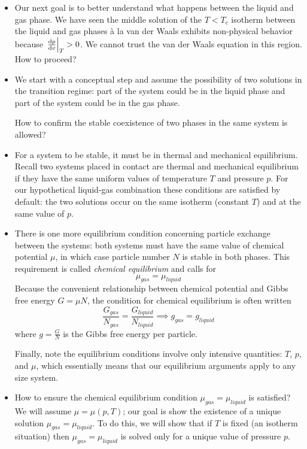 \documentclass[11pt, a4paper]{article}
\begin{document}
\begin{itemize}
	\item Our next goal is to better understand what happens between the liquid and gas phase. We have seen the middle solution of the $ T < T_{c} $ isotherm between the liquid and gas phases \`{a} la van der Waals exhibits non-physical behavior because $ \eval{\dv{p}{v}}_{T} > 0 $. We cannot trust the van der Waals equation in this region. How to proceed?
	
	\item We start with a conceptual step and assume the possibility of two solutions in the transition regime: part of the system could be in the liquid phase and part of the system could be in the gas phase. 
		
	How to confirm the stable coexistence of two phases in the same system is allowed? 
	
	\item For a system to be stable, it must be in thermal and mechanical equilibrium. Recall two systems placed in contact are thermal and mechanical equilibrium if they have the same uniform values of temperature $ T $ and pressure $ p $. For our hypothetical liquid-gas combination these conditions are satisfied by default: the two solutions occur on the same isotherm (constant $ T $) and at the same value of $ p $. 
	
	\item There is one more equilibrium condition concerning particle exchange between the systems: both systems must have the same value of chemical potential $ \mu $, in which case particle number $ N $ is stable in both phases. This requirement is called \textit{chemical equilibrium} and calls for
	\begin{equation*}
		\mu_{gas} = \mu_{liquid}
	\end{equation*}
	Because the convenient relationship between chemical potential and Gibbs free energy $ G = \mu N $, the condition for chemical equilibrium is often written
	\begin{equation*}
		\frac{G_{gas}}{N_{gas}} = \frac{G_{liquid}}{N_{liquid}} \implies g_{gas} = g_{liquid}
	\end{equation*}
	where $ g = \frac{G}{N} $ is the Gibbs free energy per particle.
	
	Finally, note the equilibrium conditions involve only intensive quantities: $ T $, $ p $, and $ \mu $, which essentially means that our equilibrium arguments apply to any size system.
	
	\item How to ensure the chemical equilibrium condition $ \mu_{gas} = \mu_{liquid} $ is satisfied? We will assume $ \mu = \mu(p, T) $; our goal is show the existence of a unique solution $ \mu_{gas} = \mu_{liquid} $. To do this, we will show that if $ T $ is fixed (an isotherm situation) then $ \mu_{gas} = \mu_{liquid} $ is solved only for a unique value of pressure $ p $.
	

\end{itemize}
\end{document}
